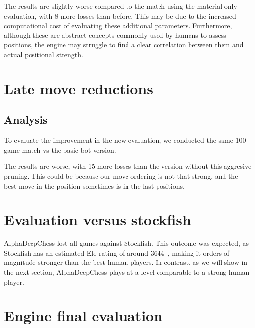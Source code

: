 \noindent The results are slightly worse compared to the match using the material-only evaluation, with 8 more losses than before. This may be due to the increased computational cost of evaluating these additional parameters. Furthermore, although these are abstract concepts commonly used by humans to assess positions, the engine may struggle to find a clear correlation between them and actual positional strength.

\section{Late move reductions}

\subsection*{Analysis}

To evaluate the improvement in the new evaluation, we conducted the same 100 game match vs the basic bot version.

\begin{center}
\medskip
\end{center}

\noindent The results are worse, with 15 more losses than the version without this aggresive pruning. This could be because our move ordering is not that strong, and the best move in the position sometimes is in the last positions.

\newpage

\section{Evaluation versus stockfish}

\begin{center}
\medskip
\end{center}

\noindent AlphaDeepChess lost all games against Stockfish. This outcome was expected, as Stockfish has an estimated Elo rating of around 3644~\cite{StockfishElo}, making it orders of magnitude stronger than the best human players. In contrast, as we will show in the next section, AlphaDeepChess plays at a level comparable to a strong human player.

\section{Engine final evaluation}

